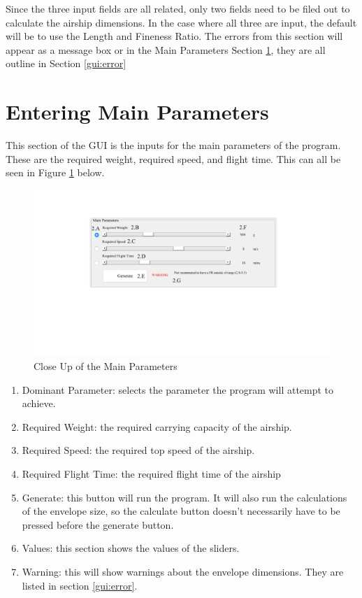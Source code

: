 \documentclass[../main.tex]{subfiles}
\begin{document}
Since the three input fields are all related, only two fields need to be filed out to calculate the airship dimensions. In the case where all three are input, the default will be to use the Length and Fineness Ratio. The errors from this section will appear as a message box or in the Main Parameters Section \ref{gui:parameters}, they are all outline in Section \ref{gui:error}

\section{Entering Main Parameters} \label{gui:parameters}
This section of the GUI is the inputs for the main parameters of the program. These are the required weight, required speed, and flight time. This can all be seen in Figure \ref{fig:gui2} below.

\begin{figure}[H]
	\centering
	\includegraphics[width=0.7\linewidth]{img/gui/guiSection2.pdf}
	\caption{Close Up of the Main Parameters}
	\label{fig:gui2}
\end{figure}

\begin{enumerate} [	A]
	\item Dominant Parameter: selects the parameter the program will attempt to achieve.
	\item Required Weight: the required carrying capacity of the airship.
	\item Required Speed: the required top speed of the airship.
	\item Required Flight Time: the required flight time of the airship
	\item Generate: this button will run the program. It will also run the calculations of the envelope size, so the calculate button doesn't necessarily have to be pressed before the generate button.
	\item Values: this section shows the values of the sliders.
	\item Warning: this will show warnings about the envelope dimensions. They are listed in section \ref{gui:error}.
\end{enumerate}
\end{document}

